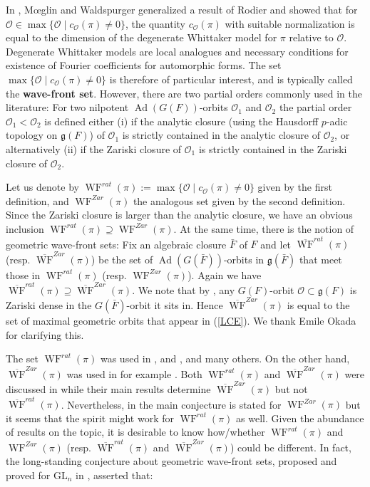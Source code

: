 \documentclass[11pt]{amsart}
\theoremstyle{remark}
\newcommand{\cO}{\mathcal{O}}
\newcommand{\Ad}{\operatorname{Ad}}
\newcommand{\fg}{\mathfrak{g}}
\newcommand{\WF}{\operatorname{WF}}
\newcommand{\bWF}{\overline{\operatorname{WF}}}
\begin{document}
In \cite{MW87}, M\oe glin and Waldspurger generalized a result of Rodier \cite{Rod75} and showed that for $\cO\in\max\{\cO\;|\;c_{\cO}(\pi)\not=0\}$, the quantity $c_{\cO}(\pi)$ with suitable normalization is equal to the dimension of the degenerate Whittaker model for $\pi$ relative to $\cO$. Degenerate Whittaker models are local analogues and necessary conditions for existence of Fourier coefficients for automorphic forms. The set $\max\{\cO\;|\;c_{\cO}(\pi)\not=0\}$ is therefore of particular interest, and is typically called the {\bf wave-front set}. However, there are two partial orders commonly used in the literature: For two nilpotent $\Ad(G(F))$-orbits $\cO_1$ and $\cO_2$ the partial order $\cO_1<\cO_2$ is defined either (i) if the analytic closure (using the Hausdorff $p$-adic topology on $\fg(F)$) of $\cO_1$ is strictly contained in the analytic closure of $\cO_2$, or alternatively (ii) if the Zariski closure of $\cO_1$ is strictly contained in the Zariski closure of $\cO_2$.

Let us denote by $\WF^{rat}(\pi):=\max\{\cO\;|\;c_{\cO}(\pi)\not=0\}$ given by the first definition, and $\WF^{Zar}(\pi)$ the analogous set given by the second definition. Since the Zariski closure is larger than the analytic closure, we have an obvious inclusion $\WF^{rat}(\pi)\supseteq \WF^{Zar}(\pi)$. At the same time, there is the notion of geometric wave-front sets: Fix an algebraic closure $\bar{F}$ of $F$ and let $\bWF^{rat}(\pi)$ (resp. $\bWF^{Zar}(\pi)$) be the set of $\Ad(G(\bar{F}))$-orbits in $\fg(\bar{F})$ that meet those in $\WF^{rat}(\pi)$ (resp. $\WF^{Zar}(\pi)$). Again we have $\bWF^{rat}(\pi)\supseteq \bWF^{Zar}(\pi)$. We note that by \cite[Prop. 3.5.75]{Poo17}, any $G(F)$-orbit $\cO\subset\fg(F)$ is Zariski dense in the $G(\bar{F})$-orbit it sits in. Hence $\bWF^{Zar}(\pi)$ is equal to the set of maximal geometric orbits that appear in (\ref{LCE}). We thank Emile Okada for clarifying this.

The set $\WF^{rat}(\pi)$ was used in \cite{MW87}, \cite{Moe96} and \cite{GGS21}, and many others. On the other hand, $\bWF^{Zar}(\pi)$ was used in for example \cite{Wal18}. Both $\WF^{rat}(\pi)$ and $\bWF^{Zar}(\pi)$ were discussed in \cite{CMBO23} while their main results determine $\bWF^{Zar}(\pi)$ but not $\bWF^{rat}(\pi)$. Nevertheless, in \cite{JLZ22a} the main conjecture 
\cite[Conj. 1.3]{JLZ22a} is stated for $\WF^{Zar}(\pi)$ but it seems that the spirit might work for $\WF^{rat}(\pi)$ as well. Given the abundance of results on the topic, it is desirable to know how/whether $\WF^{rat}(\pi)$ and $\WF^{Zar}(\pi)$ (resp. $\bWF^{rat}(\pi)$ and $\bWF^{Zar}(\pi)$) could be different. In fact, the long-standing conjecture about geometric wave-front sets, proposed and proved for $\mathrm{GL}_n$ in \cite{MW87}, asserted that:
\end{document}
